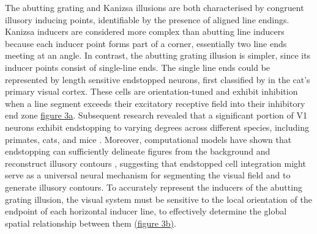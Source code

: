 \documentclass[12pt]{article}
\begin{document}
The abutting grating and Kanizsa illusions are both characterised by congruent illusory inducing points, identifiable by the presence of aligned line endings. Kanizsa inducers are considered more complex than abutting line inducers because each inducer point forms part of a corner, essentially two line ends meeting at an angle. In contrast, the abutting grating illusion is simpler, since its inducer points consist of single-line ends. The single line ends could be represented by length sensitive endstopped neurons, first classified by \textcite{hubelRECEPTIVEFIELDSFUNCTIONAL1965} in the cat's primary visual cortex. These cells are orientation-tuned and exhibit inhibition when a line segment exceeds their excitatory receptive field into their inhibitory end zone \hyperref[fig:endstop_mechanism]{figure 3a}.  Subsequent research revealed that a significant portion of V1 neurons exhibit endstopping to varying degrees across different species, including primates, cats, and mice \autocite{deangelisLengthWidthTuning1994,jonesSurroundSuppressionPrimate2001,sceniakVisualSpatialCharacterization2001}. Moreover, computational models have shown that endstopping can sufficiently delineate figures from the background and reconstruct illusory contours \autocite{vonderheydtMechanismsContourPerception1989}, suggesting that endstopped cell integration might serve as a universal neural mechanism for segmenting the visual field and to generate illusory contours. To accurately represent the inducers of the abutting grating illusion, the visual system must be sensitive to the local orientation of the endpoint of each horizontal inducer line, to effectively determine the global spatial relationship between them \hyperref[fig:endstop_mechanism]{(figure 3b)}.
\end{document}
